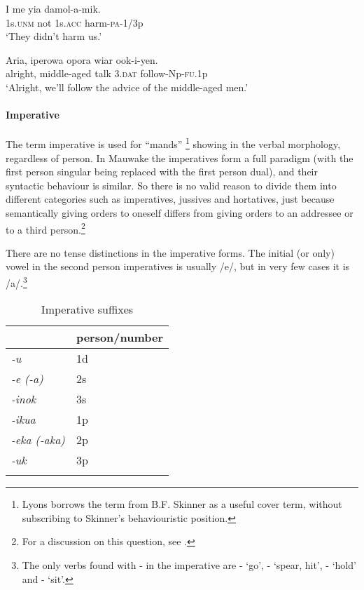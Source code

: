 \ea%
\label{ex:3:x693}
\gll I me yia damol-a-mik. \\
1s.\textsc{unm} not 1s.\textsc{acc} harm-\textsc{pa}-1/3p\\
\glt`They didn't harm us.'
\z

\ea%
\label{ex:3:x694}
\gll Aria, iperowa opora wiar ook-i-yen. \\
alright, middle-aged talk 3.\textsc{dat} follow-Np-\textsc{fu}.1p\\
\glt`Alright, we'll follow the advice of the middle-aged men.'
\z

\paragraph{Imperative}\label{sec:3.8.3.3.2}
{}
The term imperative is used for ``mands'' \citep[745]{Lyons1977}\footnote{Lyons borrows the term from B.F. Skinner as a useful cover term, without subscribing to Skinner's behaviouristic position.} showing in the verbal morphology, regardless of person. In Mauwake the imperatives form a full paradigm (with the first person singular being replaced with the first person dual), and their syntactic behaviour is similar. So there is no valid reason to divide them into different categories such as imperatives, jussives and hortatives, just because semantically giving orders to oneself differs from giving orders to an addressee or to a third person.\footnote{For a discussion on this question, see \citet[109--111]{Palmer1986}.}

There are no tense distinctions in the imperative forms. The initial (or only) vowel in the second person imperatives is usually /e/, but in very few cases it is /a/.\footnote{The only verbs found with - in the imperative are - `go', - `spear, hit', - `hold' and - `sit'.}

\begin{table}
\begin{tabular}{>{\itshape}ll}
\mytoprule
&person/number \\
\midrule 
-u & 1d\\
-e (-a) & 2s\\
-inok & 3s\\
-ikua & 1p\\
-eka (-aka) & 2p\\
-uk & 3p\\
\mybottomrule 
\end{tabular}
\caption{Imperative suffixes}
\label{tab:12}
\end{table}


